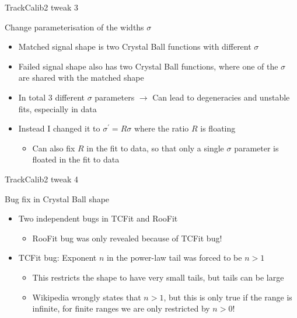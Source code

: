\documentclass[xcolor={dvipsnames}]{beamer}
\begin{document}
\begin{frame}{TrackCalib2 tweak 3}
  \vspace{0.0cm}
  \begin{center}
    {\large Change parameterisation of the widths $\sigma$}
  \end{center}
  \vspace{0.5cm}
  \begin{itemize}
    \setlength\itemsep{1.0em}
    \item{Matched signal shape is two Crystal Ball functions with different $\sigma$}
    \item{Failed signal shape also has two Crystal Ball functions, where one of the $\sigma$ are shared with the matched shape}
    \item{In total $3$ different $\sigma$ parameters $\to$ Can lead to degeneracies and unstable fits, especially in data}
    \item{Instead I changed it to $\sigma^\prime = R\sigma$ where the ratio $R$ is floating}
    \begin{itemize}
      \item{Can also fix $R$ in the fit to data, so that only a single $\sigma$ parameter is floated in the fit to data}
    \end{itemize}
  \end{itemize}
\end{frame}

\begin{frame}{TrackCalib2 tweak 4}
  \vspace{0.0cm}
  \begin{center}
    {\large Bug fix in Crystal Ball shape}
  \end{center}
  \vspace{0.5cm}
  \begin{itemize}
    \setlength\itemsep{1.0em}
    \item{Two independent bugs in TCFit and RooFit}
    \begin{itemize}
      \item{RooFit bug was only revealed because of TCFit bug!}
    \end{itemize}
    \item{TCFit bug: Exponent $n$ in the power-law tail was forced to be $n > 1$}
    \begin{itemize}
      \item{This restricts the shape to have very small tails, but tails can be large}
      \item{Wikipedia wrongly states that $n > 1$, but this is only true if the range is infinite, for finite ranges we are only restricted by $n > 0$!}
    \end{itemize}
  \end{itemize}
\end{frame}
\end{document}
